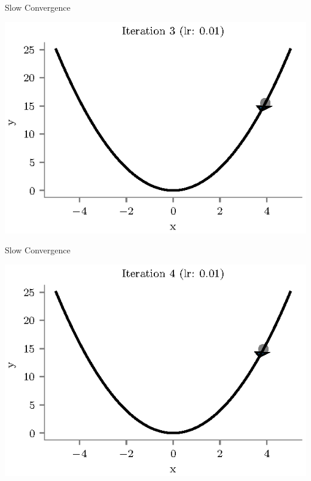 \documentclass{beamer}
\begin{document}
\begin{frame}{Slow Convergence}
\begin{center}
\includegraphics[totalheight=6cm]{undershooting-3.eps}
\end{center}
\end{frame}

\begin{frame}{Slow Convergence}
\begin{center}
\includegraphics[totalheight=6cm]{undershooting-4.eps}
\end{center}
\end{frame}
\end{document}
